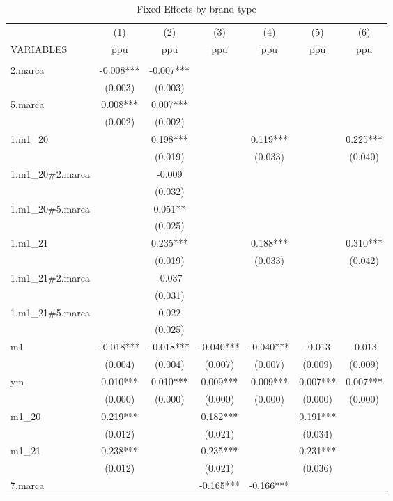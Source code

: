 \begin{longtable}{lcccccc} 
	\caption{Fixed Effects by brand type}\label{tab:2}\\	
	\hline
 & (1) & (2) & (3) & (4) & (5) & (6) \\
VARIABLES & ppu & ppu & ppu & ppu & ppu & ppu \\ \hline
 &  &  &  &  &  &  \\
2.marca & -0.008*** & -0.007*** &  &  &  &  \\
 & (0.003) & (0.003) &  &  &  &  \\
5.marca & 0.008*** & 0.007*** &  &  &  &  \\
 & (0.002) & (0.002) &  &  &  &  \\
1.m1\_20 &  & 0.198*** &  & 0.119*** &  & 0.225*** \\
 &  & (0.019) &  & (0.033) &  & (0.040) \\
1.m1\_20\#2.marca &  & -0.009 &  &  &  &  \\
 &  & (0.032) &  &  &  &  \\
1.m1\_20\#5.marca &  & 0.051** &  &  &  &  \\
 &  & (0.025) &  &  &  &  \\
1.m1\_21 &  & 0.235*** &  & 0.188*** &  & 0.310*** \\
 &  & (0.019) &  & (0.033) &  & (0.042) \\
1.m1\_21\#2.marca &  & -0.037 &  &  &  &  \\
 &  & (0.031) &  &  &  &  \\
1.m1\_21\#5.marca &  & 0.022 &  &  &  &  \\
 &  & (0.025) &  &  &  &  \\
m1 & -0.018*** & -0.018*** & -0.040*** & -0.040*** & -0.013 & -0.013 \\
 & (0.004) & (0.004) & (0.007) & (0.007) & (0.009) & (0.009) \\
ym & 0.010*** & 0.010*** & 0.009*** & 0.009*** & 0.007*** & 0.007*** \\
 & (0.000) & (0.000) & (0.000) & (0.000) & (0.000) & (0.000) \\
m1\_20 & 0.219*** &  & 0.182*** &  & 0.191*** &  \\
 & (0.012) &  & (0.021) &  & (0.034) &  \\
m1\_21 & 0.238*** &  & 0.235*** &  & 0.231*** &  \\
 & (0.012) &  & (0.021) &  & (0.036) &  \\
7.marca &  &  & -0.165*** & -0.166*** &  &  \\

\end{longtable}
